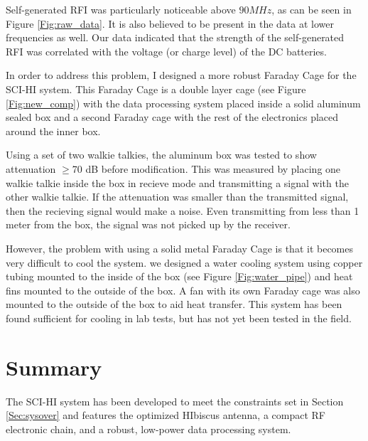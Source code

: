 Self-generated RFI was particularly noticeable above $90 MHz$, as can be seen in Figure \ref{Fig:raw_data}. It is also believed to be present in the data at lower frequencies as well. Our data indicated that the strength of the self-generated RFI was correlated with the voltage (or charge level) of the DC batteries. 

In order to address this problem, I designed a more robust Faraday Cage for the SCI-HI system. This Faraday Cage is a double layer cage (see Figure \ref{Fig:new_comp}) with the data processing system placed inside a solid aluminum sealed box and a second Faraday cage with the rest of the electronics placed around the inner box. 

Using a set of two walkie talkies, the aluminum box was tested to show attenuation $\geq$70 dB before modification. This was measured by placing one walkie talkie inside the box in recieve mode and transmitting a signal with the other walkie talkie. If the attenuation was smaller than the transmitted signal, then the recieving signal would make a noise. Even transmitting from less than 1 meter from the box, the signal was not picked up by the receiver. 

However, the problem with using a solid metal Faraday Cage is that it becomes very difficult to cool the system. we designed a water cooling system using copper tubing mounted to the inside of the box (see Figure \ref{Fig:water_pipe}) and heat fins mounted to the outside of the box. A fan with its own Faraday cage was also mounted to the outside of the box to aid heat transfer. This system has been found sufficient for cooling in lab tests, but has not yet been tested in the field. 



\section{Summary}

The SCI-HI system has been developed to meet the constraints set in Section \ref{Sec:sysover} and features the optimized HIbiscus antenna, a compact RF electronic chain, and a robust, low-power data processing system. 
